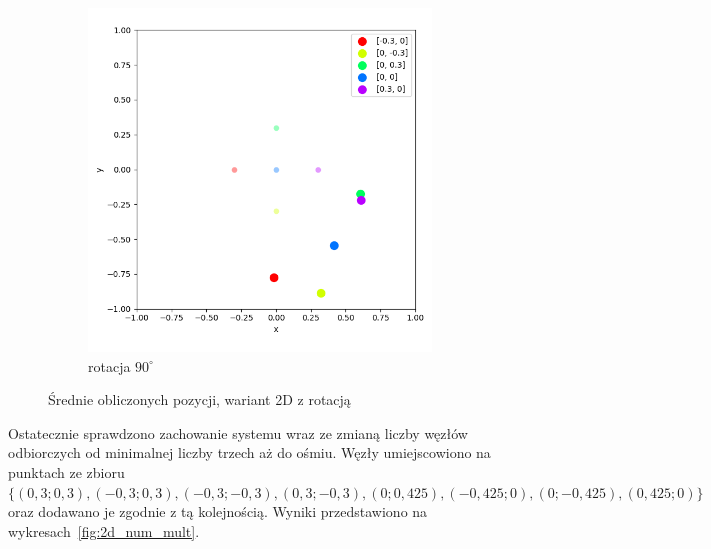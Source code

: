\begin{figure}[H]
    \ContinuedFloat\centering
    \begin{subfigure}{.5\textwidth}
        \centering
        \includegraphics[width=\linewidth]{pics/mult_lat_2d_angle/positions_90_mean.png}
        \caption{rotacja $90^{\circ}$}
        \label{pic:2d_90_angle_mult}
    \end{subfigure}
    \caption{Średnie obliczonych pozycji, wariant 2D z rotacją}
    \label{fig:2d_angle_mult}
\end{figure}

Ostatecznie sprawdzono zachowanie systemu wraz ze zmianą liczby węzłów odbiorczych od minimalnej liczby trzech aż do ośmiu. Węzły umiejscowiono na punktach ze zbioru $\{(0,3;0,3), (-0,3;0,3), (-0,3;-0,3), (0,3;-0,3), (0; 0,425), (-0,425; 0), (0; -0,425), (0,425; 0)\}$ oraz dodawano je zgodnie z tą kolejnością. Wyniki przedstawiono na wykresach~\ref{fig:2d_num_mult}. 

